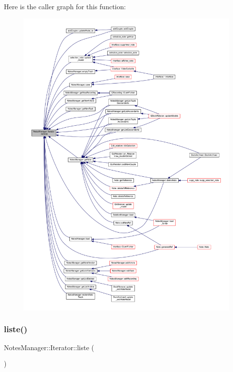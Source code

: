 Here is the caller graph for this function\+:\nopagebreak
\begin{figure}[H]
\begin{center}
\leavevmode
\includegraphics[width=350pt]{class_notes_manager_1_1_iterator_a09b30631af5b7627b2b5a655a8ac450d_icgraph}
\end{center}
\end{figure}
\mbox{\label{class_notes_manager_1_1_iterator_a99e3eb098c3b5c7b3041731d10a18c88}} 
\subsubsection{\texorpdfstring{liste()}{liste()}}
{\footnotesize\ttfamily Notes\+Manager\+::\+Iterator\+::liste (\begin{DoxyParamCaption}{ }\end{DoxyParamCaption})\hspace{0.3cm}{\ttfamily [inline]}}



